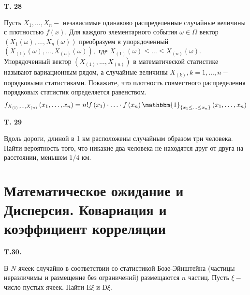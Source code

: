 \documentclass[a4paper,12pt]{article} %
\begin{document}
\begin{example} \textbf{T. 28 }
	

Пусть $X_{1}, \ldots, X_{n}-$ независимые одинаково распределенные случайные величины с плотностью $f(x) .$ 
Для каждого элементарного события $\omega \in \Omega$ вектор $\left(X_{1}(\omega), \ldots, X_{n}(\omega)\right)$ преобразуем в 
упорядоченный $\left(X_{(1)}(\omega), \ldots, X_{(n)}(\omega)\right),$ 
где $X_{(1)}(\omega) \leq \ldots \leq X_{(n)}(\omega) .$ 
Упорядоченный вектор $\left(X_{(1)}, \ldots, X_{(n)}\right)$ в математической статистике называют вариационным рядом, а случайные величины $X_{(k)}, k=1, \ldots, n-$ порядковыми статистиками. 
Покажите, что плотность совместного распределения порядковых статистик определяется равенством.
$$
f_{X_{(1)}, \ldots, X_{(n)}}\left(x_{1}, \ldots, x_{n}\right)=
n ! f\left(x_{1}\right) \cdot \ldots \cdot f\left(x_{n}\right) \mathbbm{1}_{\left\{x_{1} \leq \ldots \leq x_{n}\right\}}\left(x_{1}, \ldots, x_{n}\right)
$$








\end{example}



\begin{example} \textbf{T. 29 }

Вдоль дороги, длиной в 1 км расположены случайным образом три человека. 
Найти вероятность того, что никакие два человека не находятся друг от друга на расстоянии, меньшем $1 / 4$ км.






\end{example}







\section{Математическое ожидание и Дисперсия. Ковариация и коэффициент корреляции}


\begin{example} \textbf{T.30.} 

В $N$ ячеек случайно в соответствии со статистикой Бозе-Эйнштейна (частицы неразличимы и размещение без ограничений) размещаются $n$ частиц. Пусть $\xi-$ число пустых ячеек. Найти $\mathrm{E} \xi$ и $\mathrm{D} \xi$.








\end{example}
\end{document}
